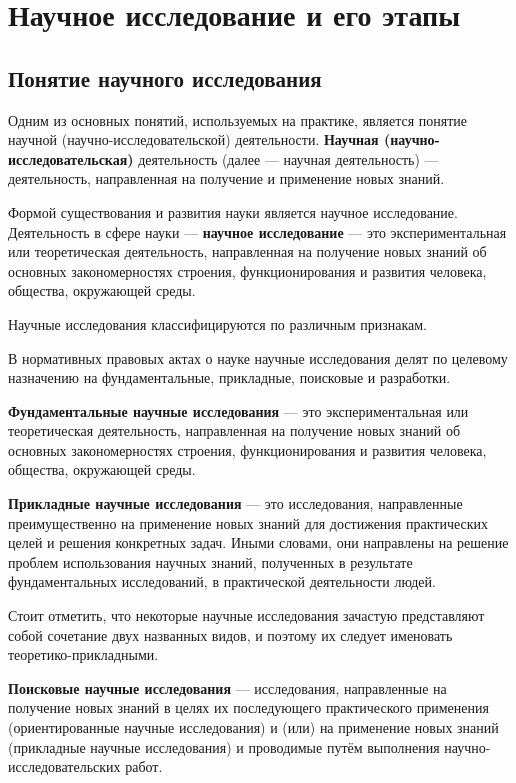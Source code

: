 \chapter{Научное исследование и его этапы}

\section{Понятие научного исследования}
Одним из основных понятий, используемых на практике, является понятие
научной (научно-исследовательской) деятельности. \textbf{Научная (научно-исследовательская)} деятельность (далее --- научная деятельность) ---
деятельность, направленная на получение и применение новых знаний. \cite{lit1}

Формой существования и развития науки является научное исследование.
Деятельность в сфере науки --- \textbf{научное исследование} --- это экспериментальная или
теоретическая деятельность, направленная на получение новых знаний об
основных закономерностях строения, функционирования и развития человека,
общества, окружающей среды. \cite{lit1}

Научные исследования классифицируются по различным признакам. \cite{lit1}

В нормативных правовых актах \cite{npa1,npa2} о науке научные исследования делят по
целевому назначению на фундаментальные, прикладные, поисковые и
разработки.

\textbf{Фундаментальные научные исследования} --- это экспериментальная или
теоретическая деятельность, направленная на получение новых знаний об
основных закономерностях строения, функционирования и развития человека,
общества, окружающей среды.

\textbf{Прикладные научные исследования} --- это исследования, направленные
преимущественно на применение новых знаний для достижения практических
целей и решения конкретных задач. Иными словами, они направлены на решение
проблем использования научных знаний, полученных в результате
фундаментальных исследований, в практической деятельности людей.

Стоит отметить, что некоторые научные исследования зачастую представляют собой сочетание двух
названных видов, и поэтому их следует именовать теоретико-прикладными.

\textbf{Поисковые научные исследования} --- исследования,
направленные на получение новых знаний в целях их последующего
практического применения (ориентированные научные исследования) и (или) на
применение новых знаний (прикладные научные исследования) и проводимые
путём выполнения научно-исследовательских работ.

